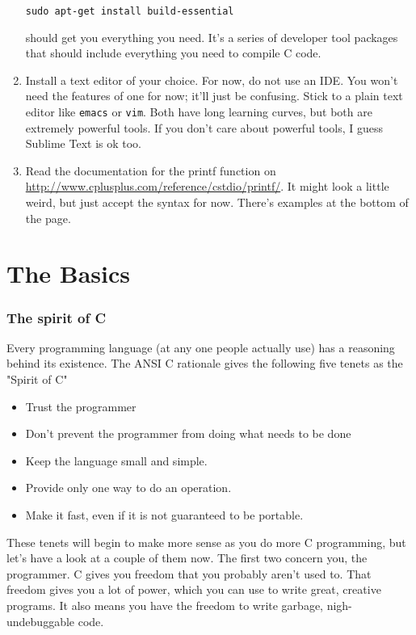 \documentclass[ebook,11pt,oneside,openany]{memoir}
\begin{document}
\begin{enumerate}
\begin{verbatim}
sudo apt-get install build-essential
\end{verbatim}

should get you everything you need. It's a series of developer tool packages that should include everything you need to compile C code.

\item Install a text editor of your choice. For now, do not use an IDE. You won't need the features of one for now; it'll just be confusing. Stick to a plain text editor like \texttt{emacs} or \texttt{vim}. Both have long learning curves, but both are extremely powerful tools. If you don't care about powerful tools, I guess Sublime Text is ok too.

\item Read the documentation for the printf function on \url{http://www.cplusplus.com/reference/cstdio/printf/}. It might look a little weird, but just accept the syntax for now. There's examples at the bottom of the page. 

\end{enumerate}


\chapter{The Basics}
\subsection{The spirit of C}
Every programming language (at any one people actually use) has a reasoning behind its existence. The ANSI C rationale gives the following five tenets as the "Spirit of C"

\begin{itemize}
\item Trust the programmer
\item Don't prevent the programmer from doing what needs to be done
\item Keep the language small and simple.
\item Provide only one way to do an operation.
\item Make it fast, even if it is not guaranteed to be portable.
\end{itemize}

These tenets will begin to make more sense as you do more C programming, but let's have a look at a couple of them now. The first two concern you, the programmer. C gives you freedom that you probably aren't used to. That freedom gives you a lot of power, which you can use to write great, creative programs. It also means you have the freedom to write garbage, nigh-undebuggable code.
\end{document}
